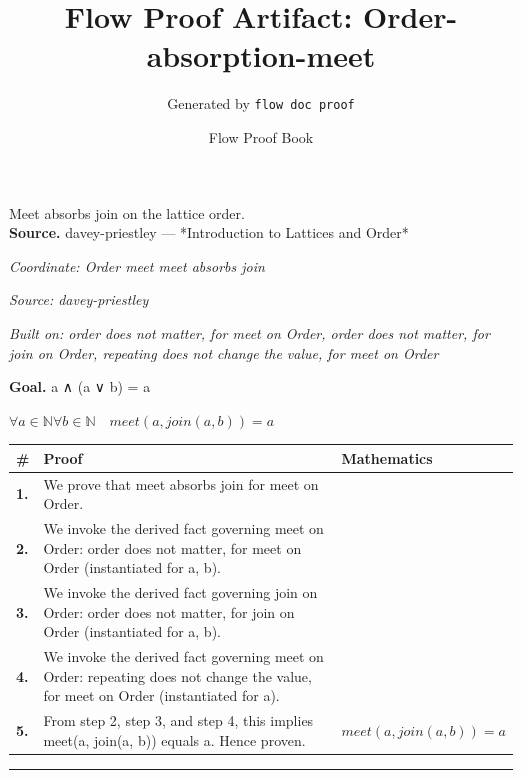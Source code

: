 \documentclass[11pt]{article}
\title{Flow Proof Artifact: Order-absorption-meet}
\author{Generated by \texttt{flow doc proof}}
\date{Flow Proof Book}
\theoremstyle{definition}
\begin{document}
\maketitle
Meet absorbs join on the lattice order.\\[0.5em]
\textbf{Source.} davey-priestley — *Introduction to Lattices and Order*\\[0.5em]
\bigskip
{}\par
\smallskip\noindent\textit{Coordinate: Order \cdot meet \cdot meet absorbs join}\par
\smallskip\noindent\textit{Source: davey-priestley}\par
\smallskip\noindent\textit{Built on: order does not matter, for meet on Order, order does not matter, for join on Order, repeating does not change the value, for meet on Order}\par
\medskip
\noindent\textbf{Goal.} a ∧ (a ∨ b) = a\par
\noindent$\displaystyle \forall a \in \mathbb{N} \forall b \in \mathbb{N}\quad meet(a, join(a, b)) = a$\par
\medskip
\noindent
\begin{tabular}{@{} >{\raggedright\arraybackslash}p{} >{\raggedright\arraybackslash}p{} >{\raggedleft\arraybackslash}p{} @{}}
\textbf{\#} & \textbf{Proof} & \textbf{Mathematics} \\
\midrule
\textbf{1.} & We prove that meet absorbs join for meet on Order. & \\[0.45em]
\textbf{2.} & We invoke the derived fact governing meet on Order: order does not matter, for meet on Order (instantiated for a, b). & \\[0.45em]
\textbf{3.} & We invoke the derived fact governing join on Order: order does not matter, for join on Order (instantiated for a, b). & \\[0.45em]
\textbf{4.} & We invoke the derived fact governing meet on Order: repeating does not change the value, for meet on Order (instantiated for a). & \\[0.45em]
\textbf{5.} & From step 2, step 3, and step 4, this implies meet(a, join(a, b)) equals a. Hence proven. & $\displaystyle meet(a, join(a, b)) = a$ \\[0.45em]
\bottomrule
\end{tabular}
\label{thm:Order-meet-meet_absorbs_join}
\par\medskip\hrule
\end{document}
